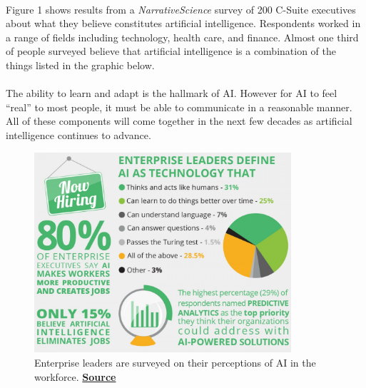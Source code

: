 \documentclass{article}
\begin{document}
    \paragraph{}
      Figure 1 shows results from a \textit{NarrativeScience} survey of 200 C-Suite
      executives about what they believe constitutes artificial intelligence.
      Respondents worked in a range of fields including technology, health care,
      and finance. Almost one third of people surveyed believe that
      artificial intelligence is a combination of the things listed in the graphic
      below.

    \paragraph{}
      The ability to learn and adapt is the hallmark of AI. However for AI to feel
      ``real'' to most people, it must be able to communicate in a
      reasonable manner. All of these components will come
      together in the next few decades as artificial intelligence continues to
      advance.

    \begin{figure}[ht]
      \centering
      \captionsetup{width=.85\linewidth}
      \includegraphics[width=0.85\textwidth,height=\textheight, keepaspectratio]{Figure1}
      \caption{Enterprise leaders are surveyed on their perceptions of AI in the workforce.
               \href{http://thumbnails-visually.netdna-ssl.com/artificial-intelligence-is-not-killing-jobs_557b4376e27b8_w1500.jpg}
               {\textbf{Source}}}
    \end{figure}

  \cleardoublepage
\end{document}
